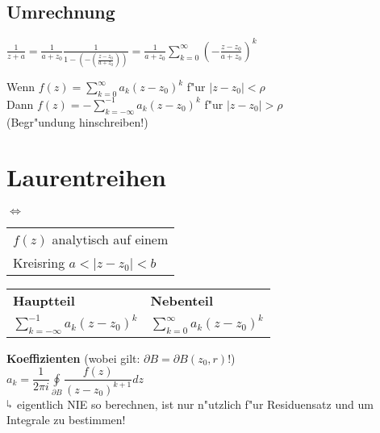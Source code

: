 \subsection{Umrechnung}
\(\displaystyle \frac{1}{z+a} = \frac{1}{a+z_0} \frac{1}{1-\left(-\left(\frac{z-z_0}{a+z_0}\right)\right)}
= \frac{1}{a + z_0} \sum_{k=0}^{\infty}\left(-\frac{z-z_0}{a+z_0}\right)^k\)

Wenn \(\displaystyle f(z) = \sum_{k=0}^\infty a_k(z-z_0)^k\) f"ur \(\vert z-z_0 \vert < \rho\)\\
Dann \(\displaystyle f(z) = -\sum_{k=-\infty}^{-1} a_k(z-z_0)^k\) f"ur \(\vert z-z_0 \vert > \rho\)\\
(Begr"undung hinschreiben!)
\section{Laurentreihen}

 \( \Longleftrightarrow \)
\begin{tabular}{l} \(f(z)\) analytisch auf einem\\ Kreisring \( a < \vert z-z_0 \vert < b\) \end{tabular}

\begin{tabular}{ll}
	\textbf{Hauptteil}							&	\textbf{Nebenteil}\\
	\(\displaystyle \sum_{k=-\infty}^{-1} a_k (z-z_0)^k\)	&	\(\displaystyle \sum_{k=0}^{\infty} a_k (z-z_0)^k\)\\
\end{tabular}

\textbf{Koeffizienten} (wobei gilt: \(\partial B = \partial B(z_0,r)\)!)\\
\(\displaystyle a_k = \dfrac{1}{2\pi i}  \oint\limits_{\partial B} \dfrac{f(z)}{(z-z_0)^{k+1}}dz\)\\
\(\rotatebox[origin=c]{180}{$\Lsh$}\) eigentlich NIE so berechnen, ist nur n"utzlich f"ur Residuensatz und um Integrale
zu bestimmen!